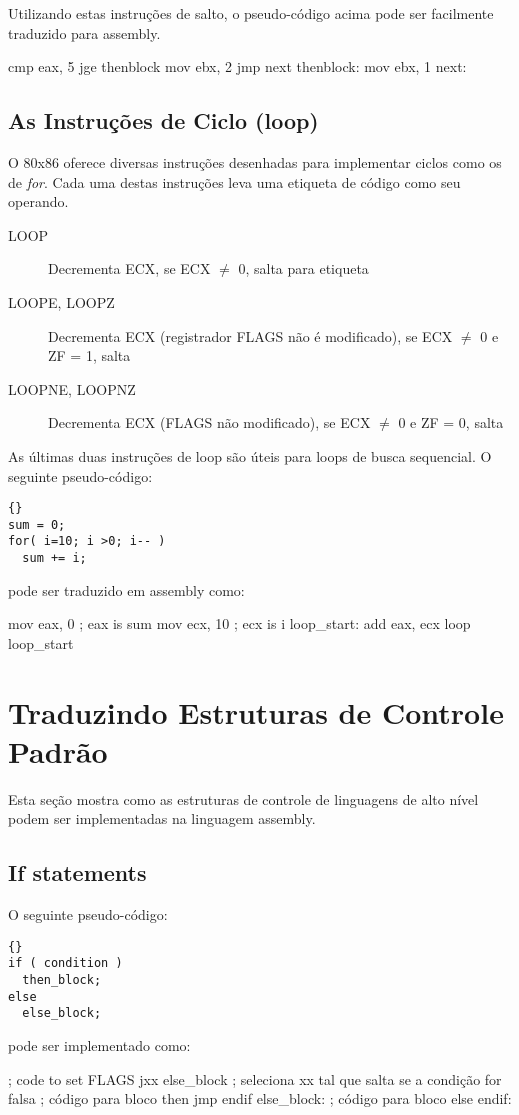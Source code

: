 Utilizando estas instruções de salto, o pseudo-código acima pode ser facilmente traduzido
para assembly.
\begin{AsmCodeListing}[frame=none]
      cmp    eax, 5
      jge    thenblock
      mov    ebx, 2
      jmp    next
thenblock:
      mov    ebx, 1
next:
\end{AsmCodeListing}

\subsection{As Instruções de Ciclo (loop)}

O 80x86 oferece diversas instruções desenhadas para implementar 
ciclos como os de \emph{for}. Cada uma destas instruções leva uma etiqueta
de código como seu operando.
\begin{description}
\item[LOOP] 
Decrementa ECX, se ECX $\neq$ 0, salta para etiqueta
\item[LOOPE, LOOPZ]
 
Decrementa ECX (registrador FLAGS não é modificado), se
                    ECX $\neq$ 0 e ZF = 1, salta
\item[LOOPNE, LOOPNZ]
 
Decrementa ECX (FLAGS não modificado), se ECX $\neq$ 0
                      e ZF = 0, salta
\end{description}

As últimas duas instruções de loop são úteis para loops de busca sequencial. O
seguinte pseudo-código:
\begin{lstlisting}[stepnumber=0]{}
sum = 0;
for( i=10; i >0; i-- )
  sum += i;
\end{lstlisting}
\noindent pode ser traduzido em assembly como:
\begin{AsmCodeListing}[frame=none]
      mov    eax, 0          ; eax is sum
      mov    ecx, 10         ; ecx is i
loop_start:
      add    eax, ecx
      loop   loop_start
\end{AsmCodeListing}

\section{Traduzindo Estruturas de Controle Padrão}

Esta seção mostra como as estruturas de controle de linguagens de alto nível
podem ser implementadas na linguagem assembly.

\subsection{If statements }
O seguinte pseudo-código:
\begin{lstlisting}[stepnumber=0]{}
if ( condition )
  then_block;
else
  else_block;
\end{lstlisting}
\noindent pode ser implementado como:
\begin{AsmCodeListing}[frame=none]
      ; code to set FLAGS
      jxx    else_block    ; seleciona xx tal que salta se a condição for falsa
      ; código para bloco then
      jmp    endif
else_block:
      ; código para bloco else
endif:
\end{AsmCodeListing}


